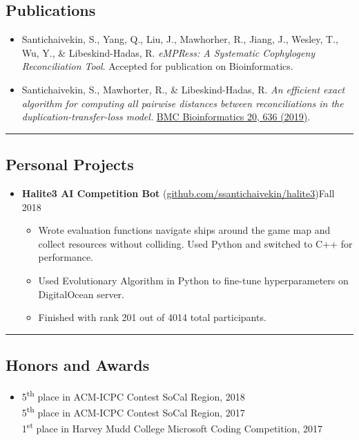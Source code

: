 \documentclass[10pt,letterpaper]{article}
\begin{document}
\subsection*{Publications}
\begin{itemize}[label={}]
  \parskip=-0.45em
  \item Santichaivekin, S., Yang, Q., Liu, J., Mawhorher, R., Jiang, J., Wesley, T., Wu, Y., \& Libeskind-Hadas, R. \textit{eMPRess: A Systematic Cophylogeny Reconciliation Tool}. Accepted for publication on Bioinformatics.
  \vspace{0.2em}
  \item Santichaivekin, S., Mawhorter, R., \& Libeskind-Hadas, R. \textit{An efficient exact algorithm for computing all pairwise distances between reconciliations in the duplication-transfer-loss model.} \href{https://doi.org/10.1186/s12859-019-3203-9}{BMC Bioinformatics 20, 636 (2019)}.
\end{itemize}

  
\hrule
\vspace{-0.95em}
\subsection*{Personal Projects}
  \begin{itemize}
    \parskip=-0.45em
    \item[]
    {\textbf{Halite3 AI Competition Bot} (\href{https://github.com/ssantichaivekin/halite3}
    {github.com/ssantichaivekin/halite3})\hfill {Fall 2018}}
    \begin{itemize}[label=\textbullet]
        \item  Wrote evaluation functions navigate ships around the game map and collect resources without colliding.
        Used Python and switched to C++ for performance.
        \item Used Evolutionary Algorithm in Python to fine-tune hyperparameters on DigitalOcean server.
        \item Finished with rank 201 out of 4014 total participants.
    \end{itemize}
  \end{itemize}

\hrule
\vspace{-0.95em}
\subsection*{Honors and Awards}
  \begin{itemize}
    \parskip=-0.5em
    \item[]
    {5\textsuperscript{th} place in ACM-ICPC Contest SoCal Region, 2018}\\
    {5\textsuperscript{th} place in ACM-ICPC Contest SoCal Region, 2017}\\
    {1\textsuperscript{st} place in Harvey Mudd College Microsoft Coding Competition, 2017}
  \end{itemize}

\end{document}
